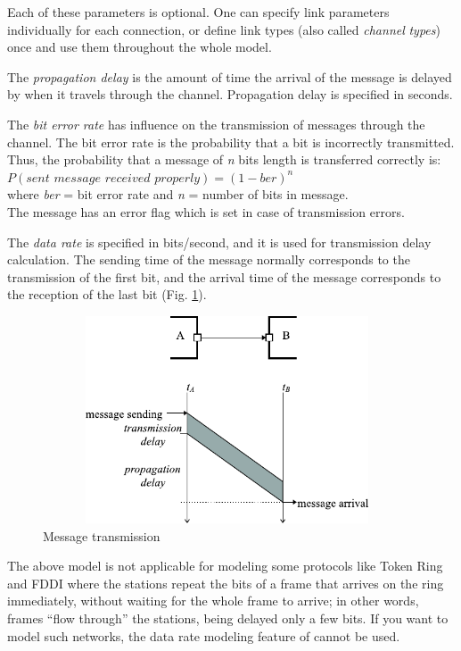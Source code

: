 Each of these parameters is optional. One can specify link parameters
individually for each connection, or define link types (also
called \textit{channel} \textit{types}) once and use them throughout the
whole model.

The \textit{propagation delay} is the amount of time the arrival of
the message is delayed by when it travels through the channel.
Propagation delay is specified in seconds.

The \textit{bit error rate} has influence on the transmission of messages
through the channel. The bit error rate is the probability that
a bit is incorrectly transmitted. Thus, the probability that
a message of \textit{n} bits length is transferred correctly is:\\


$P( \textit{sent message received properly} ) = (1 - \textit{ber})^{\mathit{n}}$\\
where \textit{ber} = bit error rate and \textit{n} = number of bits in message.\\


The message has an error flag which is set in case of transmission
errors.

The \textit{data rate} is specified in bits/second, and it is used
for transmission delay calculation. The sending time of the message
normally corresponds to the transmission of the first bit, and
the arrival time of the message corresponds to the reception
of the last bit (Fig. \ref{fig:ch-overview:message-transm}).

\begin{figure}[htbp]
\begin{center}
\includegraphics[width=4.301in, height=2.417in]{figures/usmanFig4}
\caption{Message transmission}
\label{fig:ch-overview:message-transm}
\end{center}
\end{figure}

The above model is not applicable for modeling some protocols like
Token Ring and FDDI where the stations repeat the bits of a frame that
arrives on the ring immediately, without waiting for the whole frame
to arrive; in other words, frames ``flow through'' the stations, being
delayed only a few bits. If you want to model such networks, the data
rate modeling feature of {\opp} cannot be used.

